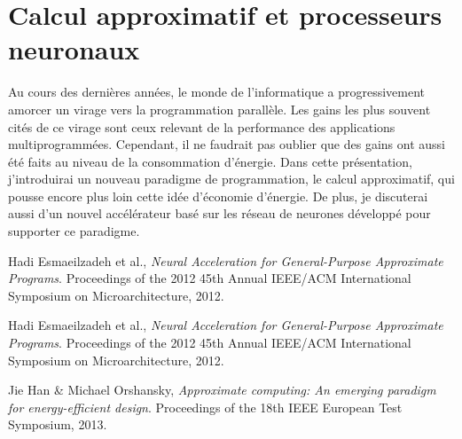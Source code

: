 \documentclass{article}
\begin{document}
\newpage

\section*{Calcul approximatif et processeurs neuronaux}
Au cours des dernières années, le monde de l'informatique a progressivement amorcer un virage vers la programmation parallèle. Les gains les plus souvent cités de ce virage sont ceux relevant de la performance des applications multiprogrammées. Cependant, il ne faudrait pas oublier que des gains ont aussi été faits au niveau de la consommation d'énergie. Dans cette présentation, j'introduirai un nouveau paradigme de programmation, le calcul approximatif, qui pousse encore plus loin cette idée d'économie d'énergie. De plus, je discuterai aussi d'un nouvel accélérateur basé sur les réseau de neurones développé pour supporter ce paradigme.
\renewcommand\refname{Références NPU}
\begin{thebibliography}{9}
          Hadi Esmaeilzadeh et al.,
          \emph{Neural Acceleration for General-Purpose Approximate Programs}.
          Proceedings of the 2012 45th Annual IEEE/ACM International Symposium on Microarchitecture, 2012.
          
          Hadi Esmaeilzadeh et al.,
          \emph{Neural Acceleration for General-Purpose Approximate Programs}.
          Proceedings of the 2012 45th Annual IEEE/ACM International Symposium on Microarchitecture, 2012.
          
          Jie Han \& Michael Orshansky,
          \emph{Approximate computing: An emerging paradigm for energy-efficient design}.
          Proceedings of the 18th IEEE European Test Symposium, 2013.
         
\end{thebibliography}

\newpage
\end{document}
